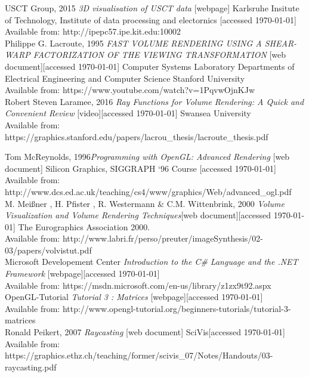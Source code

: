 \documentclass[twoside, english, 11pt]{report}
\begin{document}
\small USCT Group, 2015 \textit{3D visualisation of USCT data} [webpage] Karlsruhe Insitute of Technology, Institute of data processing and electornics [accessed \today] \\
Available from: http://ipepc57.ipe.kit.edu:10002\\

\small Philippe G. Lacroute, 1995 \textit{FAST VOLUME RENDERING USING A SHEAR-WARP FACTORIZATION OF THE VIEWING TRANSFORMATION} [web document][accessed \today] Computer Systems Laboratory
Departments of Electrical Engineering and Computer Science Stanford University \\
Available from: https://www.youtube.com/watch?v=1PqvwOjnKJw\\

\small Robert Steven Laramee, 2016 \textit{Ray Functions for Volume Rendering: A Quick and Convenient Review} [video][accessed \today] Swansea University \\
Available from: https://graphics.stanford.edu/papers/lacrou\_thesis/lacroute\_thesis.pdf\

\small Tom McReynolds, 1996\textit{Programming with OpenGL: Advanced Rendering} [web document] Silicon Graphics, SIGGRAPH ‘96 Course [accessed \today] \\
Available from: http://www.dcs.ed.ac.uk/teaching/cs4/www/graphics/Web/advanced\_ogl.pdf\\

\small M. Meißner , H. Pfister , R. Westermann \& C.M. Wittenbrink, 2000 \textit{Volume Visualization and Volume Rendering Techniques}[web document][accessed \today] The Eurographics Association 2000.\\
Available from: http://www.labri.fr/perso/preuter/imageSynthesis/02-03/papers/volvistut.pdf\\

\small Microsoft Developement Center \textit{Introduction to the C\# Language and the .NET Framework} [webpage][accessed \today] \\
Available from: https://msdn.microsoft.com/en-us/library/z1zx9t92.aspx\\

\small OpenGL-Tutorial \textit{Tutorial 3 : Matrices} [webpage][accessed \today] \\
Available from: http://www.opengl-tutorial.org/beginners-tutorials/tutorial-3-matrices\\

\small Ronald Peikert, 2007 \textit{Raycasting} [web document] SciVis[accessed \today] \\
Available from: https://graphics.ethz.ch/teaching/former/scivis\_07/Notes/Handouts/03-raycasting.pdf\\
\end{document}
